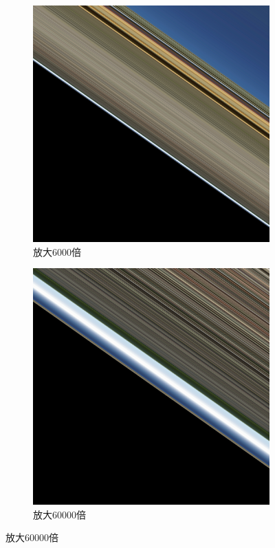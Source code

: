 \begin{figure}[H]
    \centering
    \begin{subfigure}{.45\textwidth}
        \centering
        \includegraphics[width=.8\linewidth]{images/zoomin_6000x.png}
        \caption{放大6000倍}
        \label{fig:zoomin-6000x}
    \end{subfigure}
    \begin{subfigure}{.45\textwidth}
        \centering
        \includegraphics[width=.8\linewidth]{images/zoomin_60000x.png}
        \caption{放大60000倍}
        \label{fig:zoomin-60000x}
    \end{subfigure}
\end{figure}


